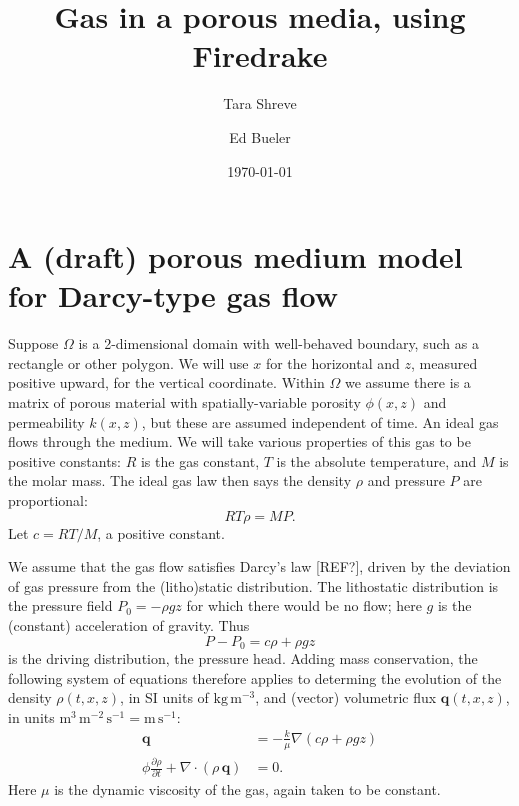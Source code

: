 \documentclass[11pt]{amsart}
\title{Gas in a porous media, using Firedrake}
\author{Tara Shreve}
\author{Ed Bueler}
\date{\today}
\newcommand{\bq}{\mathbf{q}}
\newcommand{\Div}{\nabla\cdot}
\newcommand{\grad}{\nabla}
\begin{document}
\maketitle

\thispagestyle{empty}

\section{A (draft) porous medium model for Darcy-type gas flow}

Suppose $\Omega$ is a 2-dimensional domain with well-behaved boundary, such as a rectangle or other polygon.  We will use $x$ for the horizontal and $z$, measured positive upward, for the vertical coordinate.  Within $\Omega$ we assume there is a matrix of porous material with spatially-variable porosity $\phi(x,z)$ and permeability $k(x,z)$, but these are assumed independent of time.  An ideal gas flows through the medium.  We will take various properties of this gas to be positive constants: $R$ is the gas constant, $T$ is the absolute temperature, and $M$ is the molar mass.  The ideal gas law then says the density $\rho$ and pressure $P$ are proportional:
\begin{equation}
RT \rho = M P.  \label{eq:ideal}
\end{equation}
Let $c = RT/M$, a positive constant.

We assume that the gas flow satisfies Darcy's law [REF?], driven by the deviation of gas pressure from the (litho)static distribution.  The lithostatic distribution is the pressure field $P_0=-\rho g z$ for which there would be no flow; here $g$ is the (constant) acceleration of gravity.  Thus
\begin{equation}
P-P_0 = c\rho+\rho g z \label{eq:drivingpressure}
\end{equation}
is the driving distribution, the pressure head.  Adding mass conservation, the following system of equations therefore applies to determing the evolution of the density $\rho(t,x,z)$, in SI units of $\text{kg}\,\text{m}^{-3}$, and (vector) volumetric flux $\bq(t,x,z)$, in units $\text{m}^3\,\text{m}^{-2}\,\text{s}^{-1} = \text{m}\,\text{s}^{-1}$:
\begin{subequations}
\label{eq:pmtime}
\begin{align}
\bq &= - \frac{k}{\mu} \grad\left(c \rho + \rho g z\right) \label{eq:pmtime:darcy} \\
\phi \frac{\partial \rho}{\partial t} + \Div \left(\rho\, \bq\right) &= 0. \label{eq:pmtime:masscont}
\end{align}
\end{subequations}
Here $\mu$ is the dynamic viscosity of the gas, again taken to be constant.
\end{document}
